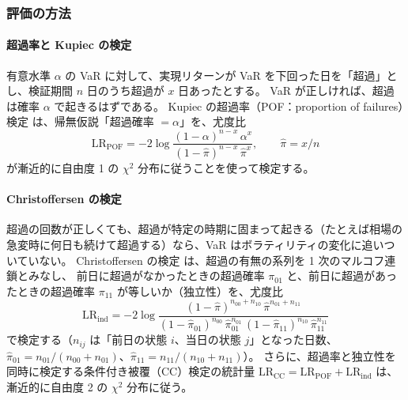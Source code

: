 \subsubsection{評価の方法}

\paragraph{超過率と Kupiec の検定}
有意水準 $\alpha$ の VaR に対して、実現リターンが VaR を下回った日を「超過」とし、検証期間 $n$ 日のうち超過が $x$ 日あったとする。
VaR が正しければ、超過は確率 $\alpha$ で起きるはずである。
Kupiec の超過率（POF：proportion of failures）検定 \parencite{kupiec1995}は、帰無仮説「超過確率 $= \alpha$」を、尤度比
\begin{equation}
  \mathrm{LR}_{\mathrm{POF}} = -2 \log \frac{(1-\alpha)^{n-x}\, \alpha^{x}}{(1-\hat\pi)^{n-x}\, \hat\pi^{x}}, \qquad \hat\pi = x / n
  \label{eq:kupiec}
\end{equation}
が漸近的に自由度 1 の $\chi^2$ 分布に従うことを使って検定する。

\paragraph{Christoffersen の検定}
超過の回数が正しくても、超過が特定の時期に固まって起きる（たとえば相場の急変時に何日も続けて超過する）なら、VaR はボラティリティの変化に追いついていない。
Christoffersen の検定 \parencite{christoffersen1998}は、超過の有無の系列を 1 次のマルコフ連鎖とみなし、
前日に超過がなかったときの超過確率 $\pi_{01}$ と、前日に超過があったときの超過確率 $\pi_{11}$ が等しいか（独立性）を、尤度比
\begin{equation}
  \mathrm{LR}_{\mathrm{ind}} = -2 \log \frac{(1-\hat\pi)^{n_{00}+n_{10}}\, \hat\pi^{n_{01}+n_{11}}}{(1-\hat\pi_{01})^{n_{00}}\, \hat\pi_{01}^{n_{01}}\, (1-\hat\pi_{11})^{n_{10}}\, \hat\pi_{11}^{n_{11}}}
  \label{eq:christoffersen}
\end{equation}
で検定する（$n_{ij}$ は「前日の状態 $i$、当日の状態 $j$」となった日数、$\hat\pi_{01} = n_{01}/(n_{00}+n_{01})$、$\hat\pi_{11} = n_{11}/(n_{10}+n_{11})$）。
さらに、超過率と独立性を同時に検定する条件付き被覆（CC）検定の統計量 $\mathrm{LR}_{\mathrm{CC}} = \mathrm{LR}_{\mathrm{POF}} + \mathrm{LR}_{\mathrm{ind}}$ は、漸近的に自由度 2 の $\chi^2$ 分布に従う。

